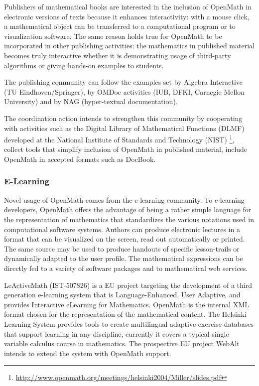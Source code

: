\documentclass{euproposal}
\begin{document}
Publishers of mathematical books are interested in the inclusion of
OpenMath in electronic versions of texts because it enhances
interactivity: with a mouse click, a mathematical object can be
transferred to a computational program or to visualization software.
The same reason holds true for OpenMath to be incorporated in other
publishing activities: the mathematics in published material becomes
truly interactive whether it is demonstrating usage of third-party
algorithms or giving hands-on examples to students.

The publishing community can follow the examples set by Algebra
Interactive (TU Eindhoven/Springer), by OMDoc activities (IUB, DFKI,
Carnegie Mellon University) and by NAG (hyper-textual documentation).

The coordination action intends to strengthen this community by
cooperating with activities such as the Digital Library of
Mathematical Functions (DLMF) developed at the National Institute of
Standards and Technology (NIST)
\footnote{\url{http://www.openmath.org/meetings/helsinki2004/Miller/slides.pdf}},
collect tools that simplify inclusion of OpenMath in published
material, include OpenMath in accepted formats such as DocBook.



\subsubsection{E-Learning}\label{sec:e-learn}
Novel usage of OpenMath comes from the e-learning community. To
e-learning developers, OpenMath offers the advantage of being a rather
simple language for the representation of mathematics that
standardizes the various notations used in computational software
systems. Authors can produce electronic lectures in a format that can
be visualized on the screen, read out automatically or printed. The
same source may be used to produce handouts of specific lesson-trails
or dynamically adapted to the user profile. The mathematical
expressions can be directly fed to a variety of software packages and
to mathematical web services.

LeActiveMath (IST-507826) is a EU project targeting the development of
a third generation e-learning system that is Language-Enhanced, User
Adaptive, and provides Interactive eLearning for Mathematics. OpenMath
is the internal XML format chosen for the representation of the
mathematical content.  The Helsinki Learning System provides tools to
create multilingual adaptive exercise databases that support learning
in any discipline, currently it covers a typical single variable
calculus course in mathematics. The prospective EU project WebAlt
intends to extend the system with OpenMath support.
\end{document}
